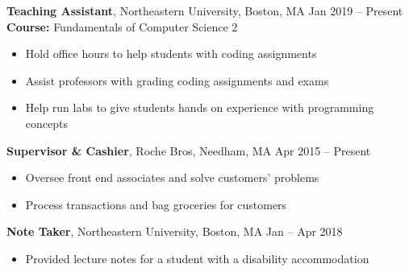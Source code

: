 \documentclass[11pt]{article}
\begin{document}
\begin{raggedright}
	\textbf{\large Teaching Assistant}, Northeastern University, Boston, MA 
	\hfill Jan 2019 -- Present \\
	\textbf{Course:} Fundamentals of Computer Science 2

	\begin{itemize}
		\item Hold office hours to help students with coding assignments
		\item Assist professors with grading coding assignments and exams
		\item Help run labs to give students hands on experience with programming concepts
	\end{itemize}
	\vspace{0.1in}

	\textbf{\large Supervisor \& Cashier}, Roche Bros, Needham, MA 
	\hfill Apr 2015 -- Present \\
	\begin{itemize}
		\item Oversee front end associates and solve customers' problems
		\item Process transactions and bag groceries for customers
	\end{itemize}
	\vspace{0.1in}

	\textbf{\large Note Taker}, Northeastern University, Boston, MA 
	\hfill Jan -- Apr 2018 \\
	\begin{itemize}
		\item Provided lecture notes for a student with a disability accommodation

	\end{itemize} 
	\vspace{0.2in}

	
\end{raggedright}	
\end{document}
